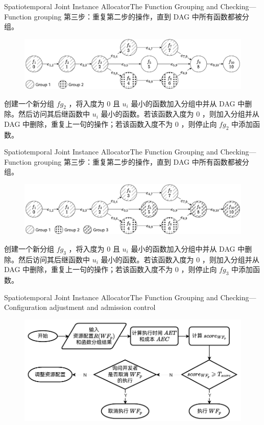 \documentclass[aspectratio=169]{beamer}
\begin{document}
\begin{frame}{Spatiotemporal Joint Instance Allocator}{The Function Grouping and Checking---Function grouping}
  第三步：重复第二步的操作，直到 DAG 中所有函数都被分组。
  \begin{figure}
    \centering
    \includegraphics[width=\textwidth]{img/method/function-grouping-4.pdf}
  \end{figure}
  创建一个新分组 $fg_2$ ，将入度为 $0$ 且 $u_i$ 最小的函数加入分组中并从 DAG 中删除。然后访问其后继函数中 $u_i$ 最小的函数。若该函数入度为 $0$ ，则加入分组并从 DAG 中删除，重复上一句的操作；若该函数入度不为 $0$ ，则停止向 $fg_2$ 中添加函数。
\end{frame}

\begin{frame}{Spatiotemporal Joint Instance Allocator}{The Function Grouping and Checking---Function grouping}
  第三步：重复第二步的操作，直到 DAG 中所有函数都被分组。
  \begin{figure}
    \centering
    \includegraphics[width=\textwidth]{img/method/function-grouping-5.pdf}
  \end{figure}
  创建一个新分组 $fg_3$ ，将入度为 $0$ 且 $u_i$ 最小的函数加入分组中并从 DAG 中删除。然后访问其后继函数中 $u_i$ 最小的函数。若该函数入度为 $0$ ，则加入分组并从 DAG 中删除，重复上一句的操作；若该函数入度不为 $0$ ，则停止向 $fg_3$ 中添加函数。
\end{frame}

\begin{frame}{Spatiotemporal Joint Instance Allocator}{The Function Grouping and Checking---Configuration adjustment and admission control}
  \begin{figure}
    \centering
    \includegraphics[scale=0.95]{img/method/conﬁguration-adjustment-and-admission-control.pdf}
  \end{figure}
\end{frame}
\end{document}
